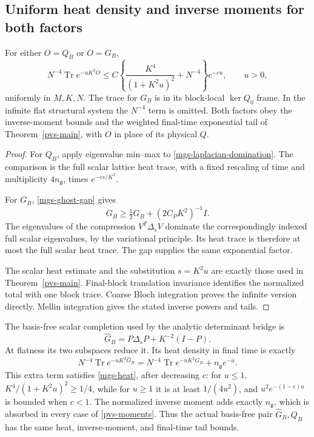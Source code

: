\subsection{Uniform heat density and inverse moments for both factors}
\label{mgs-heat-section}

\begin{corollary}
\label{mgs-heat-corollary}
For either \(O=Q_B\) or \(O=G_B\),
\begin{equation}
 N^{-4}\operatorname{Tr}e^{-uK^2O}
 \le C\left\{\frac{K^4}{(1+K^2u)^2}+N^{-4}\right\}e^{-cu},
 \qquad u>0,
 \label{mgs-heat}
\end{equation}
uniformly in \(M,K,N\).
The trace for \(G_B\) is in its block-local
\(\ker Q_0\) frame.
In the infinite flat structural system the \(N^{-4}\) term is
omitted. Both factors obey the inverse-moment bounds and the
weighted final-time exponential tail of
Theorem~\ref{pvs-main}, with \(O\) in place of its physical \(Q\).
\end{corollary}

\begin{proof}
For \(Q_B\), apply eigenvalue min--max to
\eqref{mgs-laplacian-domination}.
The comparison is the full scalar lattice heat trace, with a
fixed rescaling of time and multiplicity \(4n_{\mathfrak g}\),
times \(e^{-cs/K^2}\).

For \(G_B\), \eqref{mgs-ghost-gap} gives
\[
 G_B\ge\tfrac12G_B+(2C_PK^2)^{-1}I.
\]
The eigenvalues of the compression \(V^T\Delta_sV\)
dominate the correspondingly indexed full scalar eigenvalues,
by the variational principle.
Its heat trace is therefore at most the full scalar heat trace.
The gap supplies the same exponential factor.

The scalar heat estimate and the substitution \(s=K^2u\) are
exactly those used in Theorem~\ref{pvs-main}.
Final-block translation invariance identifies the normalized
total with one block trace.
Coarse Bloch integration proves the infinite version directly.
Mellin integration gives the stated inverse powers and tails.
\end{proof}

The basis-free scalar completion used by the analytic determinant
bridge is
\begin{equation}
 \widehat G_B=P\Delta_sP+K^{-2}(I-P).
 \label{mgs-basis-free-scalar}
\end{equation}
At flatness its two subspaces reduce it. Its heat density in final
time is exactly
\[
 N^{-4}\operatorname{Tr}e^{-uK^2\widehat G_B}
 =N^{-4}\operatorname{Tr}e^{-uK^2G_B}
                        +n_{\mathfrak g}e^{-u}.
\]
This extra term satisfies \eqref{mgs-heat}, after decreasing \(c\):
for \(u\le1\),
\(K^4/(1+K^2u)^2\ge1/4\), while for \(u\ge1\) it is at least
\(1/(4u^2)\), and \(u^2e^{-(1-c)u}\) is bounded when \(c<1\).
The normalized inverse moment adds exactly \(n_{\mathfrak g}\),
which is absorbed in every case of \eqref{pvs-moments}.
Thus the actual basis-free pair \(\widehat G_B,Q_B\) has the
same heat, inverse-moment, and final-time tail bounds.

